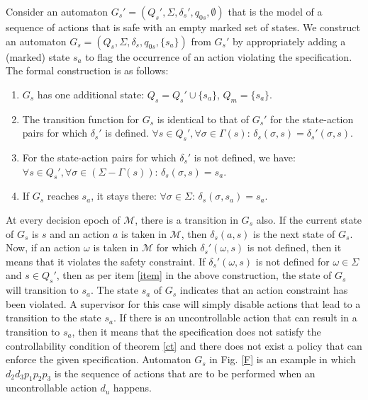 \documentclass[letterpaper, 10 pt, conference]{ieeeconf}
\begin{document}
Consider an automaton $G_s' = (Q_s', \Sigma, \delta_s', q_{0s}, \emptyset)$ that is the model of a sequence of actions that is safe with an empty marked set of states. We construct an automaton $G_s = (Q_s, \Sigma, \delta_s, q_{0s}, \{s_a\})$ from $G_s'$ by appropriately adding a (marked) state $s_a$ to flag the occurrence of an action violating the specification. The formal construction is as follows:
\begin{enumerate}
    \item $G_s$ has one additional state: $Q_s = Q_s' \cup \{s_a\}$, $Q_m=\{s_a\}$.
    \item The transition function for $G_s$ is identical to that of $G_s'$ for the state-action pairs for which $\delta_s'$ is defined.
    $\forall s\in Q_s', \forall \sigma \in \Gamma(s)$: $\delta_s(\sigma, s) = \delta_s'(\sigma, s)$.
    \item \label{item} For the state-action pairs for which $\delta_s'$ is not defined, we have: $\forall s\in Q_s', \forall \sigma \in (\Sigma - \Gamma(s))$: $\delta_s(\sigma, s) = s_a$.
    \item If $G_s$ reaches $s_a$, it stays there: $\forall \sigma \in \Sigma$: $\delta_s(\sigma, s_a) = s_a$.
\end{enumerate}
At every decision epoch of $\mathcal{M}$, there is a transition in $G_s$ also. If the current state of $G_s$ is $s$ and an action $a$ is taken in $\mathcal{M}$, then $\delta_s(a, s)$ is the next state of $G_s$. Now, if an action $\omega$ is taken in $\mathcal{M}$ for which $\delta_s'(\omega, s)$ is not defined, then it means that it violates the safety constraint. If $\delta_s'(\omega, s)$ is not defined for $\omega \in \Sigma$ and $s \in Q_s'$, then as per item \ref{item} in the above construction, the state of $G_s$ will transition to $s_a$. The state $s_a$ of $G_s$ indicates that an action constraint has been violated. A supervisor for this case will simply disable actions that lead to a transition to the state $s_a$. If there is an uncontrollable action that can result in a transition to $s_a$, then it means that the specification does not satisfy the controllability condition of theorem \ref{ct} and there does not exist a policy that can enforce the given specification. Automaton $G_s$ in Fig. \ref{F} is an example in which $d_2d_3p_1p_2p_3$ is the sequence of actions that are to be performed when an uncontrollable action $d_u$ happens. %
\end{document}
